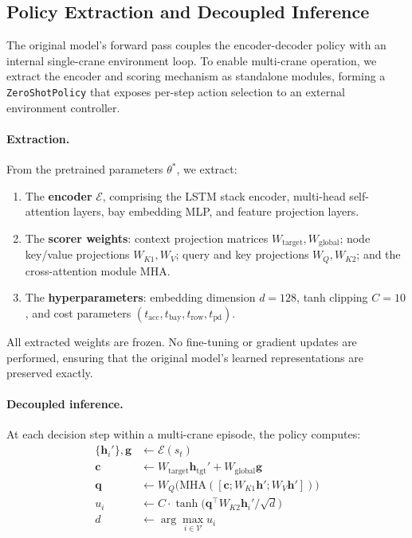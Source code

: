 \subsection{Policy Extraction and Decoupled Inference}
\label{sec:extraction}

The original model's forward pass couples the encoder-decoder policy with an internal single-crane environment loop. To enable multi-crane operation, we extract the encoder and scoring mechanism as standalone modules, forming a \texttt{ZeroShotPolicy} that exposes per-step action selection to an external environment controller.

\paragraph{Extraction.} From the pretrained parameters $\theta^*$, we extract:
\begin{enumerate}
    \item The \textbf{encoder} $\mathcal{E}$, comprising the LSTM stack encoder, multi-head self-attention layers, bay embedding MLP, and feature projection layers.
    \item The \textbf{scorer weights}: context projection matrices $W_{\text{target}}, W_{\text{global}}$; node key/value projections $W_{K1}, W_V$; query and key projections $W_Q, W_{K2}$; and the cross-attention module MHA.
    \item The \textbf{hyperparameters}: embedding dimension $d = 128$, tanh clipping $C = 10$, and cost parameters $(t_{\text{acc}}, t_{\text{bay}}, t_{\text{row}}, t_{\text{pd}})$.
\end{enumerate}

All extracted weights are frozen. No fine-tuning or gradient updates are performed, ensuring that the original model's learned representations are preserved exactly.

\paragraph{Decoupled inference.} At each decision step within a multi-crane episode, the policy computes:
\begin{align}
    \{\mathbf{h}_i'\}, \mathbf{g} &\gets \mathcal{E}(s_t) \label{eq:enc} \\
    \mathbf{c} &\gets W_{\text{target}} \mathbf{h}_{\text{tgt}}' + W_{\text{global}} \mathbf{g} \label{eq:ctx} \\
    \mathbf{q} &\gets W_Q \big( \text{MHA}([\mathbf{c}; W_{K1}\mathbf{h}'; W_V\mathbf{h}']) \big) \label{eq:query} \\
    u_i &\gets C \cdot \tanh\!\big( \mathbf{q}^\top W_{K2} \mathbf{h}_i' / \sqrt{d} \big) \label{eq:logits} \\
    d &\gets \arg\max_{i \in \mathcal{V}} u_i \label{eq:action}
\end{align}

